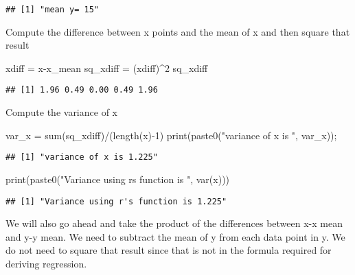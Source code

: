 \documentclass[
]{article}
\newenvironment{Shaded}{\begin{snugshade}}{\end{snugshade}}
\newcommand{\DecValTok}[1]{\textcolor[rgb]{0.00,0.00,0.81}{#1}}
\newcommand{\FunctionTok}[1]{\textcolor[rgb]{0.00,0.00,0.00}{#1}}
\newcommand{\NormalTok}[1]{#1}
\newcommand{\OtherTok}[1]{\textcolor[rgb]{0.56,0.35,0.01}{#1}}
\newcommand{\SpecialCharTok}[1]{\textcolor[rgb]{0.00,0.00,0.00}{#1}}
\newcommand{\StringTok}[1]{\textcolor[rgb]{0.31,0.60,0.02}{#1}}
\begin{document}
\begin{verbatim}
## [1] "mean y= 15"
\end{verbatim}

Compute the difference between x points and the mean of x and then
square that result

\begin{Shaded}
\begin{Highlighting}[]
\NormalTok{xdiff }\OtherTok{=}\NormalTok{ x}\SpecialCharTok{{-}}\NormalTok{x\_mean}
\NormalTok{sq\_xdiff }\OtherTok{=}\NormalTok{ (xdiff)}\SpecialCharTok{\^{}}\DecValTok{2}
\NormalTok{sq\_xdiff}
\end{Highlighting}
\end{Shaded}

\begin{verbatim}
## [1] 1.96 0.49 0.00 0.49 1.96
\end{verbatim}

Compute the variance of x

\begin{Shaded}
\begin{Highlighting}[]
\NormalTok{var\_x }\OtherTok{=} \FunctionTok{sum}\NormalTok{(sq\_xdiff)}\SpecialCharTok{/}\NormalTok{(}\FunctionTok{length}\NormalTok{(x)}\SpecialCharTok{{-}}\DecValTok{1}\NormalTok{)}
\FunctionTok{print}\NormalTok{(}\FunctionTok{paste0}\NormalTok{(}\StringTok{"variance of x is "}\NormalTok{, var\_x));}
\end{Highlighting}
\end{Shaded}

\begin{verbatim}
## [1] "variance of x is 1.225"
\end{verbatim}

\begin{Shaded}
\begin{Highlighting}[]
\FunctionTok{print}\NormalTok{(}\FunctionTok{paste0}\NormalTok{(}\StringTok{"Variance using r\textquotesingle{}s function is "}\NormalTok{, }\FunctionTok{var}\NormalTok{(x)))}
\end{Highlighting}
\end{Shaded}

\begin{verbatim}
## [1] "Variance using r's function is 1.225"
\end{verbatim}

We will also go ahead and take the product of the differences between
x-x mean and y-y mean. We need to subtract the mean of y from each data
point in y. We do not need to square that result since that is not in
the formula required for deriving regression.
\end{document}
